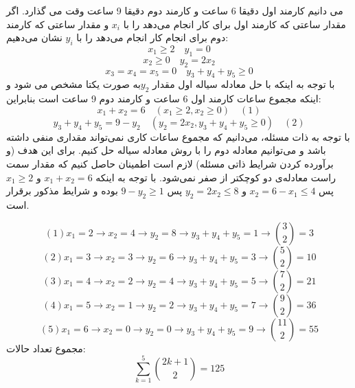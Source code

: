 \p
می دانیم کارمند اول دقیقا 6 ساعت و کارمند دوم دقیقا 9 ساعت وقت می گذارد.
اگر مقدار ساعتی که کارمند اول برای کار  انجام می‌دهد را با $x_i$ و مقدار ساعتی که کارمند دوم برای انجام کار   انجام می‌دهد را با $y_i$  نشان می‌دهیم:
$$ x_1 \geq 2 \quad y_1 = 0 $$
$$ x_2 \geq 0 \quad y_2 = 2x_2 $$
$$ x_3=x_4=x_5=0 \quad y_3  + y_4 + y_5 \geq 0 $$
\p
با توجه به اینکه با حل معادله سیاله اول مقدار $y_2$به صورت یکتا مشخص می شود و اینکه مجموع ساعات کارمند اول 6 ساعت و کارمند دوم 9 ساعت است بنابراین:
$$x_1 +x_2 = 6 \quad (x_1 \geq 2 , x_2 \geq  0)     \quad (1)$$
$$y_3 + y_4 + y_5 = 9-y_2 \quad (y_2 = 2x_2 , y_3 + y_4 + y_5  \geq 0) \quad (2)$$
\p
با توجه به ذات مسئله، می‌دانیم که مجموع ساعات کاری نمی‌تواند مقداری منفی داشته باشد و می‌توانیم معادله دوم را با روش معادله سیاله حل کنیم. برای این هدف (و برآورده کردن شرایط ذاتی مسئله) لازم است اطمینان حاصل کنیم که مقدار سمت راست معادله‌ی دو کوچکتر از صفر نمی‌شود. با توجه به اینکه
$x_1 + x_2 = 6$
و
$x_1 \geq 2$
پس
$x_2 = 6 - x_1 \leq 4$
و
$y_2 = 2x_2 \leq 8$
پس
$9 - y_2 \geq 1$
بوده و شرایط مذکور برقرار است.

$$ (1) x_1 = 2\rightarrow x_2=4 \rightarrow y_2=8 \rightarrow y_3+y_4+y_5 = 1 \rightarrow \binom{3}{2} = 3$$
$$ (2) x_1 = 3\rightarrow x_2=3 \rightarrow y_2=6 \rightarrow y_3+y_4+y_5 = 3 \rightarrow \binom{5}{2} = 10$$
$$ (3) x_1 = 4\rightarrow x_2=2 \rightarrow y_2= 4\rightarrow y_3+y_4+y_5 = 5 \rightarrow \binom{7}{2} = 21$$
$$ (4) x_1 = 5\rightarrow x_2=1 \rightarrow y_2=2 \rightarrow y_3+y_4+y_5 = 7 \rightarrow \binom{9}{2} = 36 $$
$$ (5) x_1 = 6\rightarrow x_2=0 \rightarrow y_2=0 \rightarrow y_3+y_4+y_5 = 9 \rightarrow \binom{11}{2} = 55 $$
\p
مجموع تعداد حالات: 
$$\sum_{k=1}^{5} \binom{2k+1}{2} = 125$$
